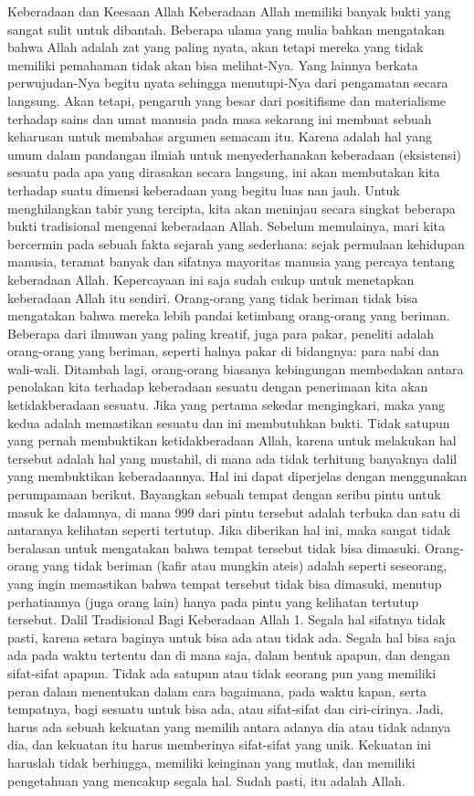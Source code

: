 \documentclass[]{article}
\author{Mohammad Fajar}
\begin{document}
Keberadaan dan Keesaan Allah
Keberadaan Allah memiliki banyak bukti yang sangat sulit untuk dibantah. Beberapa ulama yang mulia bahkan mengatakan bahwa Allah adalah zat yang paling nyata, akan tetapi mereka yang tidak memiliki pemahaman tidak akan bisa melihat-Nya. Yang lainnya berkata perwujudan-Nya begitu nyata sehingga menutupi-Nya dari pengamatan secara langsung. 
Akan tetapi, pengaruh yang besar dari positifisme dan materialisme terhadap sains dan umat manusia pada masa sekarang ini membuat sebuah keharusan untuk membahas argumen semacam itu. Karena adalah hal yang umum dalam pandangan ilmiah untuk menyederhanakan keberadaan (eksistensi) sesuatu pada apa yang dirasakan secara langsung, ini akan membutakan kita terhadap suatu dimensi keberadaan yang begitu luas nan jauh. Untuk menghilangkan tabir yang tercipta, kita akan meninjau secara singkat beberapa bukti tradisional mengenai keberadaan Allah. 
Sebelum memulainya, mari kita bercermin pada sebuah fakta sejarah yang sederhana: sejak permulaan kehidupan manusia, teramat banyak dan sifatnya mayoritas manusia yang percaya tentang keberadaan Allah.  Kepercayaan ini saja sudah cukup untuk menetapkan keberadaan Allah itu sendiri.  Orang-orang yang tidak beriman tidak bisa mengatakan bahwa mereka  lebih pandai ketimbang orang-orang yang beriman. Beberapa dari ilmuwan yang paling kreatif, juga para pakar, peneliti adalah orang-orang yang beriman, seperti halnya pakar di bidangnya: para nabi dan wali-wali. 
Ditambah lagi, orang-orang biasanya kebingungan membedakan antara penolakan kita terhadap keberadaan sesuatu dengan penerimaan kita akan ketidakberadaan sesuatu. Jika yang pertama sekedar mengingkari, maka yang kedua adalah memastikan sesuatu dan ini membutuhkan bukti. Tidak satupun yang pernah membuktikan ketidakberadaan Allah, karena untuk melakukan hal tersebut adalah hal yang mustahil, di mana ada tidak terhitung banyaknya dalil yang membuktikan keberadaannya.  Hal ini dapat diperjelas dengan menggunakan perumpamaan berikut. 
Bayangkan sebuah tempat dengan seribu pintu untuk masuk ke dalamnya, di mana 999 dari pintu tersebut adalah terbuka dan satu di antaranya kelihatan seperti tertutup. Jika diberikan hal ini, maka sangat tidak beralasan untuk mengatakan bahwa tempat tersebut tidak bisa dimasuki. Orang-orang yang tidak beriman (kafir atau mungkin ateis) adalah seperti seseorang, yang ingin memastikan bahwa tempat tersebut tidak bisa dimasuki, menutup perhatiannya (juga orang lain) hanya pada pintu yang kelihatan tertutup tersebut. 
Dalil Tradisional Bagi Keberadaan Allah
1. Segala hal sifatnya tidak pasti, karena setara baginya untuk bisa ada atau tidak ada. Segala hal bisa saja ada pada waktu tertentu dan di mana saja, dalam bentuk apapun, dan dengan sifat-sifat apapun. Tidak ada satupun atau tidak seorang pun yang memiliki peran dalam menentukan dalam cara bagaimana, pada waktu kapan, serta tempatnya, bagi sesuatu untuk bisa ada, atau sifat-sifat dan ciri-cirinya. Jadi, harus ada sebuah kekuatan yang memilih antara adanya dia atau tidak adanya dia, dan kekuatan itu harus memberinya sifat-sifat yang unik. Kekuatan ini haruslah tidak berhingga, memiliki keinginan yang mutlak, dan memiliki pengetahuan yang mencakup segala hal. Sudah pasti, itu adalah Allah.
\end{document}
